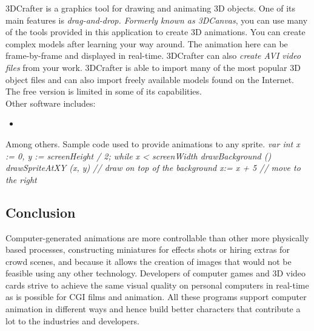 \documentclass[12pt,a4paper]{article}
\begin{document}
3DCrafter is a graphics tool for drawing and animating 3D objects. One of its main features is \textit{drag-and-drop. Formerly known as 3DCanvas}, you can use many of the tools provided in this application to create 3D animations. You can create complex models after learning your way around. The animation here can be frame-by-frame and displayed in real-time. 3DCrafter can also\textit{ create AVI video files} from your work. 3DCrafter is able to import many of the most popular 3D object files and can also import freely available models found on the Internet. The free version is limited in some of its capabilities.
\\
Other software includes:
\begin{itemize}
\item 
\end{itemize}
Among others.
Sample code used to provide animations to any sprite.
\emph{var int x := 0, y := 
screenHeight / 2; 
while x < screenWidth 
drawBackground () drawSpriteAtXY (x, y) // draw on top of the background 
x:= x + 5 // move to the right
}
\begin{center}
\section*{Conclusion}
\end{center}
Computer-generated animations are more controllable than other more physically based processes, constructing miniatures for effects shots or hiring extras for crowd scenes, and because it allows the creation of images that would not be feasible using any other technology.
Developers of computer games and 3D video cards strive to achieve the same visual quality on personal computers in real-time as is possible for CGI films and animation.
All these programs support computer animation in different ways and hence build better characters that contribute a lot to the industries and developers.
\end{document}
